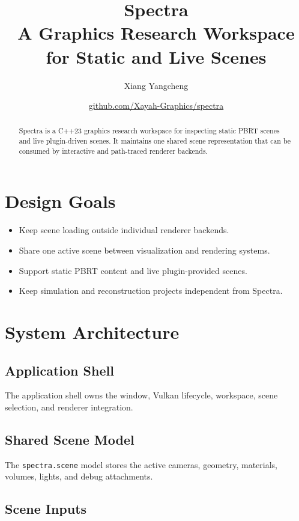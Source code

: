 \documentclass[11pt]{article}
\title{
  \textbf{Spectra}\\[0.35em]
  \large A Graphics Research Workspace for Static and Live Scenes
}
\author{Xiang Yangcheng}
\date{\href{https://github.com/Xayah-Graphics/spectra}
  {github.com/Xayah-Graphics/spectra}}
\begin{document}
\maketitle

\begin{abstract}
Spectra is a C++23 graphics research workspace for inspecting
static PBRT scenes and live plugin-driven scenes. It maintains one
shared scene representation that can be consumed by interactive and
path-traced renderer backends.
\end{abstract}

\section{Design Goals}

\begin{itemize}
  \item Keep scene loading outside individual renderer backends.
  \item Share one active scene between visualization and rendering systems.
  \item Support static PBRT content and live plugin-provided scenes.
  \item Keep simulation and reconstruction projects independent from Spectra.
\end{itemize}

\section{System Architecture}

\subsection{Application Shell}

The application shell owns the window, Vulkan lifecycle, workspace,
scene selection, and renderer integration.

\subsection{Shared Scene Model}

The \texttt{spectra.scene} model stores the active cameras, geometry,
materials, volumes, lights, and debug attachments.

\subsection{Scene Inputs}
\end{document}
